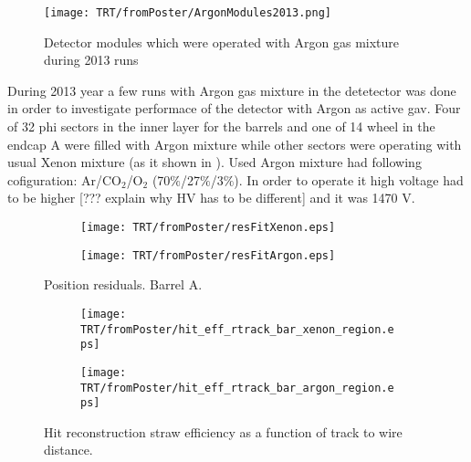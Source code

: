 
\begin{figure}
\begin{center}
 \texttt{[image: TRT/fromPoster/ArgonModules2013.png]}
\caption{\label{fig:argonModulesIn2013} Detector modules which were operated with Argon gas mixture during 2013 runs}
\end{center}
\end{figure}

During 2013 year a few runs with Argon gas mixture in the detetector was done in order to investigate performace of the detector with Argon as active gav.
Four of 32 phi sectors in the inner layer for the barrels and one of 14 wheel in the endcap A were filled with Argon mixture while other sectors were operating 
with usual Xenon mixture (as it shown in ). Used Argon mixture had following cofiguration: Ar/CO$_{2}$/O$_{2}$ (70$\%$/27$\%$/3$\%$). In order to operate it high voltage had
to be higher [??? explain why HV has to be different] and it was 1470 V.




\begin{figure}

\begin{subfigure}{.5\textwidth}
  \centering
  \texttt{[image: TRT/fromPoster/resFitXenon.eps]}
\end{subfigure}%
\begin{subfigure}{.5\textwidth}
  \centering
  \texttt{[image: TRT/fromPoster/resFitArgon.eps]}
\end{subfigure}

\caption{Position residuals. Barrel A.}
  \label{fig:resFit}
\end{figure}





\begin{figure}

\begin{subfigure}{.5\textwidth}
  \centering
  \texttt{[image: TRT/fromPoster/hit\_eff\_rtrack\_bar\_xenon\_region.eps]}
\end{subfigure}%
\begin{subfigure}{.5\textwidth}
  \centering
  \texttt{[image: TRT/fromPoster/hit\_eff\_rtrack\_bar\_argon\_region.eps]}
\end{subfigure}

\caption{Hit reconstruction straw efficiency as a function of track to wire distance.}
  \label{fig:hit_eff_rtrack_bar}
\end{figure}

